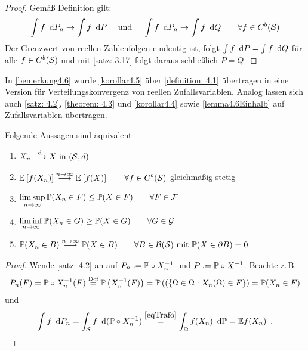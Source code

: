 \begin{proof}
	Gemäß Definition gilt:
	\begin{equation*}
		\int f \diffskip P_n \to \int f \diffskip P 
		\quad \und \quad 
		\int f \diffskip P_n \to \int f \diffskip Q \qquad \forall f\in C^b(\S)
	\end{equation*}
	Der Grenzwert von reellen Zahlenfolgen eindeutig ist, folgt $\int f \diffskip P = \int f \diffskip Q$ für alle $f \in C^b(\S)$ und mit \cref{satz: 3.17} folgt daraus schließlich $P = Q$.
\end{proof}

In \cref{bemerkung4.6} wurde \cref{korollar4.5} über \cref{definition: 4.1} übertragen in eine Version für Verteilungskonvergenz von reellen Zufallsvariablen.
Analog lassen sich auch \cref{satz: 4.2}, \cref{theorem: 4.3} und \cref{korollar4.4} sowie \cref{lemma4.6Einhalb} auf Zufallsvariablen übertragen.

\begin{satz} \label{satz4.7}
	Folgende Aussagen sind äquivalent:
	\begin{enumerate}[label=(\arabic*)]
		\item $\begin{aligned}
			X_n \distto  X\text{ in }(\S,d)
		\end{aligned}$
		\item $\begin{aligned}
			\EW[f(X_n)] \ntoinf \EW[f(X)] \qquad\forall f \in C^b(\S)
		\end{aligned}$ gleichmäßig stetig
		\item $\begin{aligned}
			\limsup_{n\to\infty} \P(X_n\in F)\le\P(X\in F)\qquad\forall F \in \F
		\end{aligned}$
		\item $\begin{aligned}
			\liminf_{n\to\infty}\P(X_n\in G)\ge\P(X\in G)\qquad\forall G\in\G
		\end{aligned}$
		\item $\begin{aligned}
			\P(X_n\in B)\ntoinf \P(X\in B)\qquad\forall B\in\B(\S)\mit\P(X\in\partial B)=0
		\end{aligned}$
	\end{enumerate}
\end{satz}

\begin{proof}
	Wende \cref{satz: 4.2} an auf $P_n \defeq \P \circ X^{-1}_n$ und $P \defeq \P \circ X^{-1}$.
	Beachte z.\,B.
	\begin{equation*}
		P_n(F) = \P\circ X^{-1}_n(F)
		\overset{\text{Def}}{=}
		\P\brackets{X_n^{-1}(F)}
		=\P\brackets{(\menge{\Omega\in\Omega:X_n(\Omega)\in F}}
		= \P(X_n \in F)
	\end{equation*}
	und
	\begin{equation*}
		\int f \diffskip P_n
		=
		\int_{\S} f\diffskip(\P\circ X_n^{-1})
		\overset{\eqref{eqTrafo}}{=}
		\int_\Omega f(X_n) \diffskip\P
		= \E{f(X_n)}  
		\satzende
	\end{equation*}
\end{proof}

